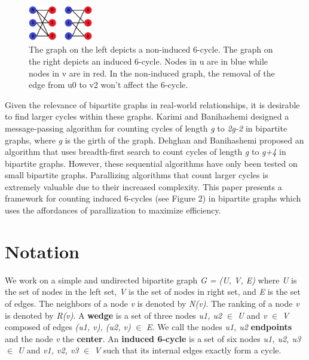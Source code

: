 \documentclass[11pt]{article}
\begin{document}
\begin{figure}[h]
    \centering
    \includegraphics[width=0.25\textwidth]{figures/Induced vs Noninduced.png}
    \caption{\small The graph on the left depicts a non-induced 6-cycle. The graph on the right depicts an induced 6-cycle. Nodes in u are in blue while nodes in v are in red. In the non-induced graph, the removal of the edge from u0 to v2 won't affect the 6-cycle.}
    \label{fig:induced}
\end{figure}

Given the relevance of bipartite graphs in real-world relationships, it is desirable to find larger cycles within these graphs.
Karimi and Banihashemi \cite{karimi2012message} designed a message-passing algorithm for counting cycles of length \textit{g} to \textit{2g-2} in bipartite graphs, where \textit{g} is the girth of the graph.
Dehghan and Banihashemi \cite{dehghan2019counting} proposed an algorithm that uses breadth-first search to count cycles of length \textit{g}  to \textit{g+4} in bipartite graphs.
However, these sequential algorithms have only been tested on small bipartite graphs.
Parallizing algorithms that count larger cycles is extremely valuable due to their increased complexity.
This paper presents a framework for counting induced 6-cycles (see Figure 2) in bipartite graphs which uses the affordances of parallization to maximize efficiency.

\section{Notation}
We work on a simple and undirected bipartite graph \textit{G = (U, V, E)} where \textit{U} is the set of nodes in the left set, \textit{V} is the set of nodes in right set, and \textit{E} is the set of edges.
The neighbors of a node \textit{v} is denoted by \textit{N(v)}.
The ranking of a node \textit{v} is denoted by \textit{R(v)}.
A \textbf{wedge} is a set of three nodes \textit{u1, u2} $\in$ \textit{U} and \textit{v} $\in$ \textit{V} composed of edges \textit{(u1, v), (u2, v)} $\in$ \textit{E}. 
We call the nodes \textit{u1, u2} \textbf{endpoints} and the node \textit{v} the \textbf{center}.
An \textbf{induced 6-cycle} is a set of six nodes \textit{u1, u2, u3} $\in$ \textit{U} and \textit{v1, v2, v3} $\in$ \textit{V} such that its internal edges exactly form a cycle.
\end{document}
